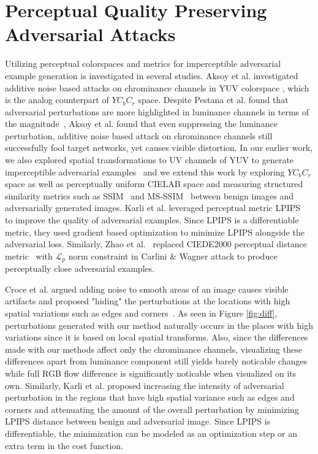 \section{Perceptual Quality Preserving Adversarial Attacks}

Utilizing perceptual colorspaces and metrics for imperceptible adversarial example generation is investigated in several studies. Aksoy et al. investigated additive noise based attacks on chrominance channels in YUV colorspace \cite{aksoy2019attack}, which is the analog counterpart of \(YC_{b}C_{r}\) space. Despite Pestana et al. found that adversarial perturbations are more highlighted in luminance channels in terms of the magnitude~\cite{Pestana2020-hm}, Aksoy et al. found that even suppressing the luminance perturbation, additive noise based attack on chrominance channels still successfully fool target networks, yet causes visible distortion. In our earlier work, we also explored spatial transformations to UV channels of YUV to generate imperceptible adversarial examples~\cite{aydin2019imperceptible} and we extend this work by exploring \(YC_{b}C_{r}\) space as well as perceptually uniform CIELAB space and measuring structured similarity metrics such as SSIM~\cite{wang2004image} and MS-SSIM~\cite{wang2003multiscale} between benign images and adversarially generated images. Karli et al. leveraged perceptual metric LPIPS~\cite{zhang2018unreasonable} to improve the quality of adversarial examples. Since LPIPS is a differentiable metric, they used gradient based optimization to minimize LPIPS alongside the adversarial loss. Similarly, Zhao et al.~\cite{zhao2020large} replaced CIEDE2000 perceptual distance metric~\cite{luo2001development} with \(\mathcal{L}_{p}\) norm constraint in Carlini \& Wagner attack to produce perceptually close adversarial examples.

Croce et al. argued adding noise to smooth areas of an image causes visible artifacts and proposed "hiding" the perturbations at the locations with high spatial variations such as edges and corners~\cite{croce2019sparse}. As seen in Figure \ref{fig:diff}, perturbations generated with our method naturally occurs in the places with high variations since it is based on local spatial transforms. Also, since the differences made with our methods affect only the chrominance channels, visualizing these differences apart from luminance component still yields barely noticable changes while full RGB flow difference is significantly noticable when visualized on its own. Similarly, Karli et al. proposed increasing the intensity of adversarial perturbation in the regions that have high spatial variance such as edges and corners and attenuating the amount of the overall perturbation by minimizing LPIPS distance between benign and adversarial image. Since LPIPS is differentiable, the minimization can be modeled as an optimization step or an extra term in the cost function.


